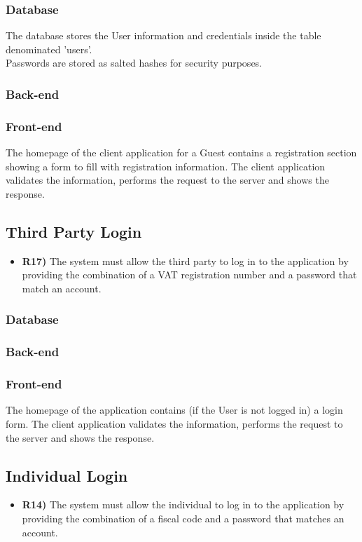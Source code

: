 \subsubsection*{Database}
The database stores the User information and credentials inside the table denominated 'users'.\\
Passwords are stored as salted hashes for security purposes.

\subsubsection*{Back-end} 

\subsubsection*{Front-end}
The homepage of the client application for a Guest contains a registration section showing a form to fill with registration information. The client application validates the information, performs the request to the server and shows the response.

\subsection{Third Party Login}
\begin{itemize}
	\item {\color{Green}\textbf{R17)}} The system must allow the third party to log in to the application by providing the combination of a VAT registration number and a password that match an account.
\end{itemize}
\subsubsection*{Database}


\subsubsection*{Back-end}


\subsubsection*{Front-end}
The homepage of the application contains (if the User is not logged in) a login form. The client application validates the information, performs the request to the server and shows the response.

\subsection{Individual Login}
\begin{itemize}
	\item {\color{ProcessBlue}\textbf{R14)}} The system must allow the individual to log in to the application by providing the combination of a fiscal code and a password that matches an account.
\end{itemize}

